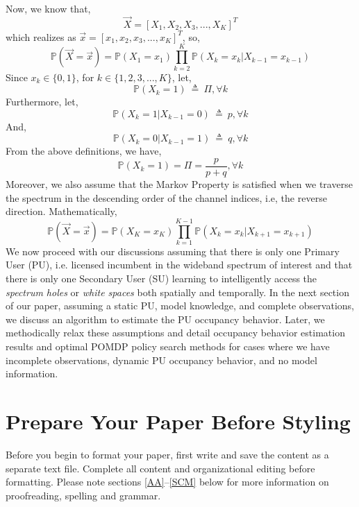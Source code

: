 \documentclass[conference]{IEEEtran}
\begin{document}
Now, we know that, 
\[\vec{X}=[X_1,X_2,X_3,...,X_K]^T\] 
which realizes as $\vec{x}=[x_1,x_2,x_3,...,x_K]^T$, so,
\begin{equation}\label{6}
    \mathbb P(\vec{X}=\vec{x})=\mathbb P(X_1=x_1) \prod_{k=2}^{K} \mathbb P(X_k=x_k|X_{k-1}=x_{k-1})
\end{equation}
Since $x_k \in \{0,1\}$, for $k \in \{1,2,3,...,K\}$, let,
\begin{equation*}
    \mathbb P(X_k=1)\ \triangleq\ \Pi, \forall k
\end{equation*}
Furthermore, let, 
\begin{equation*}
    \mathbb P(X_k=1|X_{k-1}=0)\ \triangleq\ p, \forall k
\end{equation*}
And,
\begin{equation*}
    \mathbb P(X_k=0|X_{k-1}=1)\ \triangleq\ q, \forall k
\end{equation*}
From the above definitions, we have,
\begin{equation*}
    \mathbb P(X_k=1)=\Pi=\frac{p}{p+q}, \forall k
\end{equation*}
Moreover, we also assume that the Markov Property is satisfied when we traverse the spectrum in the descending order of the channel indices, i.e, the reverse direction. Mathematically,
\begin{equation*}
\mathbb P(\vec{X}=\vec{x})=\mathbb P(X_K=x_K)\prod_{k=1}^{K-1} \mathbb P(X_{k}=x_k|X_{k+1}=x_{k+1})
\end{equation*}
We now proceed with our discussions assuming that there is only one Primary User (PU), i.e. licensed incumbent in the wideband spectrum of interest and that there is only one Secondary User (SU) learning to intelligently access the \textit{spectrum holes} or \textit{white spaces} both spatially and temporally.
In the next section of our paper, assuming a static PU, model knowledge, and complete observations, we discuss an algorithm to estimate the PU occupancy behavior. Later, we methodically relax these assumptions and detail occupancy behavior estimation results and optimal POMDP policy search methods for cases where we have incomplete observations, dynamic PU occupancy behavior, and no model information.
\section{Prepare Your Paper Before Styling}
Before you begin to format your paper, first write and save the content as a 
separate text file. Complete all content and organizational editing before 
formatting. Please note sections \ref{AA}--\ref{SCM} below for more information on 
proofreading, spelling and grammar.
\end{document}
